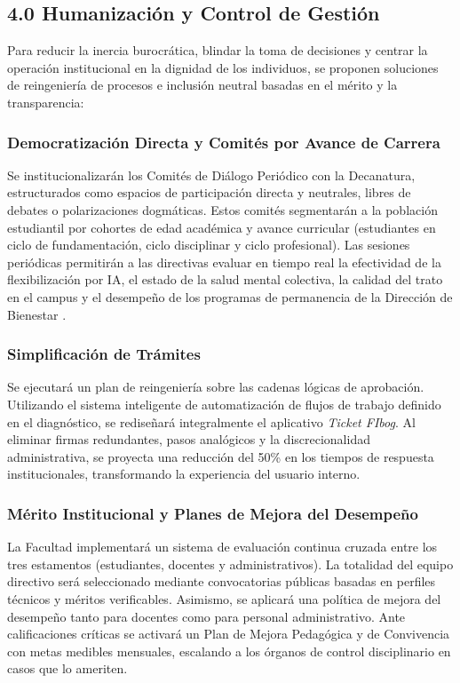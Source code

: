 \documentclass[journal,10pt,twocolumn,letterpaper]{IEEEtran}
\begin{document}
\subsection{4.0 Humanización y Control de Gestión}
Para reducir la inercia burocrática, blindar la toma de decisiones y centrar la operación institucional en la dignidad de los individuos, se proponen soluciones de reingeniería de procesos e inclusión neutral basadas en el mérito y la transparencia:

\subsubsection{Democratización Directa y Comités por Avance de Carrera}
Se institucionalizarán los Comités de Diálogo Periódico con la Decanatura, estructurados como espacios de participación directa y neutrales, libres de debates o polarizaciones dogmáticas. Estos comités segmentarán a la población estudiantil por cohortes de edad académica y avance curricular (estudiantes en ciclo de fundamentación, ciclo disciplinar y ciclo profesional). Las sesiones periódicas permitirán a las directivas evaluar en tiempo real la efectividad de la flexibilización por IA, el estado de la salud mental colectiva, la calidad del trato en el campus y el desempeño de los programas de permanencia de la Dirección de Bienestar \cite{salud_mental_engineering}.

\subsubsection{Simplificación de Trámites}
Se ejecutará un plan de reingeniería sobre las cadenas lógicas de aprobación. Utilizando el sistema inteligente de automatización de flujos de trabajo definido en el diagnóstico, se rediseñará integralmente el aplicativo \textit{Ticket FIbog}. Al eliminar firmas redundantes, pasos analógicos y la discrecionalidad administrativa, se proyecta una reducción del 50\% en los tiempos de respuesta institucionales, transformando la experiencia del usuario interno.

\subsubsection{Mérito Institucional y Planes de Mejora del Desempeño}
La Facultad implementará un sistema de evaluación continua cruzada entre los tres estamentos (estudiantes, docentes y administrativos). La totalidad del equipo directivo será seleccionado mediante convocatorias públicas basadas en perfiles técnicos y méritos verificables. Asimismo, se aplicará una política de mejora del desempeño tanto para docentes como para personal administrativo. Ante calificaciones críticas se activará un Plan de Mejora Pedagógica y de Convivencia con metas medibles mensuales, escalando a los órganos de control disciplinario en casos que lo ameriten.
\end{document}
